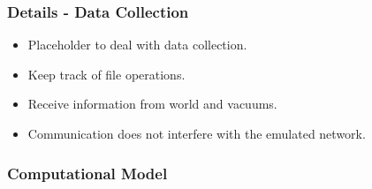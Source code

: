 \documentclass{beamer}
\begin{document}
\begin{frame}
  \frametitle{Details - Data Collection}

  \begin{itemize}
  \item Placeholder to deal with data collection.
  \item Keep track of file operations.
  \item Receive information from  world and vacuums.
  \item Communication does not interfere with the emulated network.
  \end{itemize}

\end{frame}




\begin{frame}
  \frametitle{Computational Model}
\end{frame}
\end{document}
